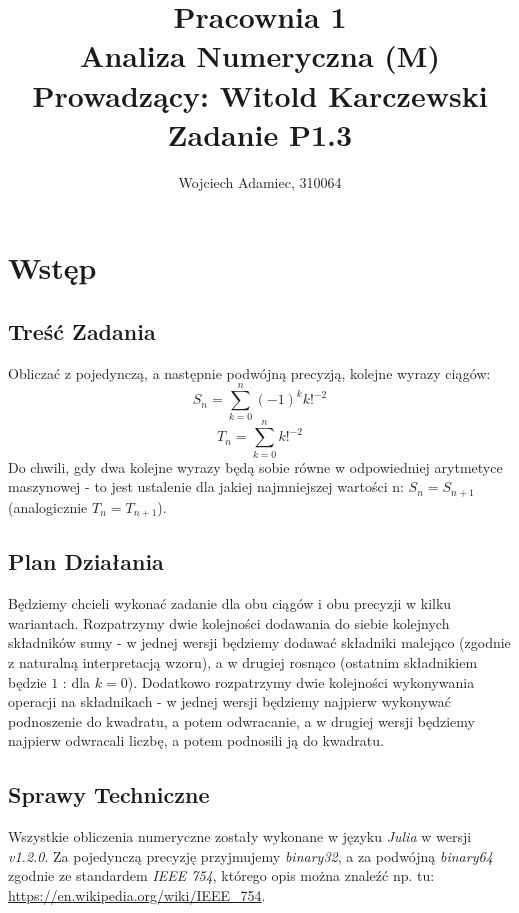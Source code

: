 \documentclass[12pt,a4paper]{article}
\begin{document}
\author{Wojciech Adamiec, 310064}
\title{
	\textbf{Pracownia 1}\\
	\large Analiza Numeryczna (M)\\
	\large Prowadzący: Witold Karczewski\\
	\large Zadanie P1.3	
}

\maketitle

\tableofcontents
\section{Wstęp}


\subsection{Treść Zadania}
Obliczać z pojedynczą, a następnie podwójną precyzją, kolejne wyrazy ciągów:\\
\begin{equation}
S_n = \sum_{k=0}^n (-1)^k k!^{-2}
\end{equation}
\begin{equation}
T_n = \sum_{k=0}^n  k!^{-2}
\end{equation}
Do chwili, gdy dwa kolejne wyrazy będą sobie równe w odpowiedniej arytmetyce maszynowej - to jest ustalenie dla jakiej najmniejszej wartości n: $S_n = S_{n+1}$ (analogicznie $T_n = T_{n+1}$).

\subsection{Plan Działania}
Będziemy chcieli wykonać zadanie dla obu ciągów i obu precyzji w kilku wariantach. Rozpatrzymy dwie kolejności dodawania do siebie kolejnych składników sumy - w jednej wersji będziemy dodawać składniki malejąco (zgodnie z naturalną interpretacją wzoru), a w drugiej rosnąco (ostatnim składnikiem będzie $1$ : dla $k=0$). Dodatkowo rozpatrzymy dwie kolejności wykonywania operacji na składnikach - w jednej wersji będziemy najpierw wykonywać podnoszenie do kwadratu, a potem odwracanie, a w drugiej wersji będziemy najpierw odwracali liczbę, a potem podnosili ją do kwadratu.

\subsection{Sprawy Techniczne}
Wszystkie obliczenia numeryczne zostały wykonane w języku \textit{Julia} w wersji \textit{v1.2.0}. Za pojedynczą precyzję przyjmujemy \textit{binary32}, a za podwójną \textit{binary64} zgodnie ze standardem \textit{IEEE 754}, którego opis można znaleźć np. tu: \url{https://en.wikipedia.org/wiki/IEEE_754}.
\end{document}
